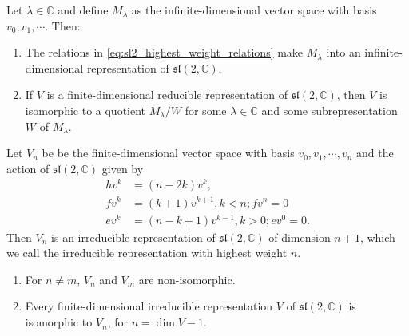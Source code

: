 \documentclass{report}
\begin{document}
\begin{lemma}
    Let $\lambda \in \mathbb C$ and define $M_\lambda$ as the infinite-dimensional vector space with basis $v_0, v_1, \cdots$. Then:
    \begin{enumerate}[label = (\roman*)]
        \item The relations in \cref{eq:sl2_highest_weight_relations} make $M_\lambda$ into an infinite-dimensional representation of $\mathfrak{sl}(2, \mathbb C)$.
        \item If $V$ is a finite-dimensional reducible representation of $\mathfrak{sl}(2, \mathbb C)$, then $V$ is isomorphic to a quotient $M_\lambda / W$ for some $\lambda \in \mathbb C$ and some subrepresentation $W$ of $M_\lambda$.
    \end{enumerate}
\end{lemma}

\begin{theorem}
    Let $V_n$ be be the finite-dimensional vector space with basis $v_0, v_1, \cdots, v_n$ and the action of $\mathfrak{sl}(2, \mathbb C)$ given by
    \begin{align*}
        h v^k &= (n - 2k) v^k,\\
        f v^k &= (k+1) v^{k+1}, k < n; fv^n = 0\\
        e v^k &= (n - k + 1) v^{k-1}, k > 0; ev^0 = 0.        
    \end{align*}
    Then $V_n$ is an irreducible representation of $\mathfrak{sl}(2, \mathbb C)$ of dimension $n+1$, which we call the irreducible representation with highest weight $n$.
    \begin{enumerate}[label = (\roman*)]
        \item For $n \neq m$, $V_n$ and $V_m$ are non-isomorphic.
        \item Every finite-dimensional irreducible representation $V$ of $\mathfrak{sl}(2, \mathbb C)$ is isomorphic to $V_n$, for $n = \dim V - 1$.
    \end{enumerate}
\end{theorem}
\end{document}
